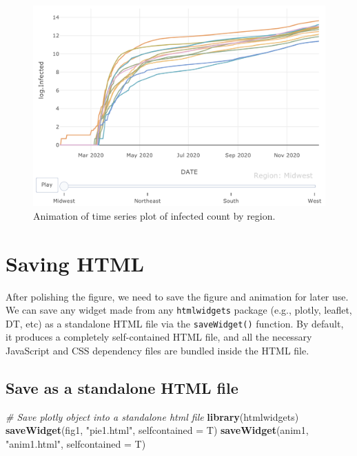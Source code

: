 \documentclass[]{book}
\newenvironment{Shaded}{\begin{snugshade}}{\end{snugshade}}
\newcommand{\KeywordTok}[1]{\textcolor[rgb]{0.13,0.29,0.53}{\textbf{#1}}}
\newcommand{\DataTypeTok}[1]{\textcolor[rgb]{0.13,0.29,0.53}{#1}}
\newcommand{\StringTok}[1]{\textcolor[rgb]{0.31,0.60,0.02}{#1}}
\newcommand{\CommentTok}[1]{\textcolor[rgb]{0.56,0.35,0.01}{\textit{#1}}}
\newcommand{\NormalTok}[1]{#1}
\begin{document}
\begin{figure}

{\centering \includegraphics[width=0.75\linewidth]{figures/animation3} 

}

\caption{Animation of time series plot of infected count by region.}\label{fig:animate3}
\end{figure}

\section{Saving HTML}\label{saving-html}

After polishing the figure, we need to save the figure and animation for
later use. We can save any widget made from any \texttt{htmlwidgets}
package (e.g., plotly, leaflet, DT, etc) as a standalone HTML file via
the \texttt{saveWidget()} function. By default, it produces a completely
self-contained HTML file, and all the necessary JavaScript and CSS
dependency files are bundled inside the HTML file.

\subsection{Save as a standalone HTML
file}\label{save-as-a-standalone-html-file}

\begin{Shaded}
\begin{Highlighting}[]
\CommentTok{# Save plotly object into a standalone html file}
\KeywordTok{library}\NormalTok{(htmlwidgets)}
\KeywordTok{saveWidget}\NormalTok{(fig1, }\StringTok{"pie1.html"}\NormalTok{, }\DataTypeTok{selfcontained =}\NormalTok{ T)}
\KeywordTok{saveWidget}\NormalTok{(anim1, }\StringTok{"anim1.html"}\NormalTok{, }\DataTypeTok{selfcontained =}\NormalTok{ T)}
\end{Highlighting}
\end{Shaded}
\end{document}
